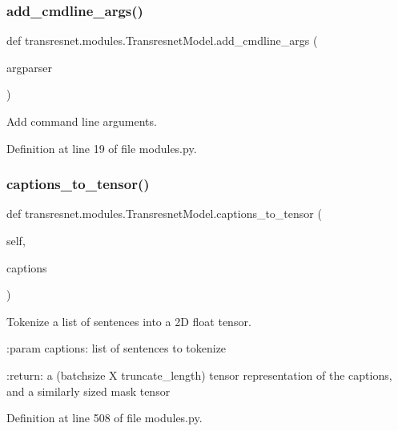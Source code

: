 \subsubsection{\texorpdfstring{add\+\_\+cmdline\+\_\+args()}{add\_cmdline\_args()}}
{\footnotesize\ttfamily def transresnet.\+modules.\+Transresnet\+Model.\+add\+\_\+cmdline\+\_\+args (\begin{DoxyParamCaption}\item[{}]{argparser }\end{DoxyParamCaption})\hspace{0.3cm}{\ttfamily [static]}}

\begin{DoxyVerb}Add command line arguments.\end{DoxyVerb}
 

Definition at line 19 of file modules.\+py.

\mbox{\label{classtransresnet_1_1modules_1_1TransresnetModel_a6d8ed65c210d4ab0a665ba305257c3d6}} 
\subsubsection{\texorpdfstring{captions\+\_\+to\+\_\+tensor()}{captions\_to\_tensor()}}
{\footnotesize\ttfamily def transresnet.\+modules.\+Transresnet\+Model.\+captions\+\_\+to\+\_\+tensor (\begin{DoxyParamCaption}\item[{}]{self,  }\item[{}]{captions }\end{DoxyParamCaption})}

\begin{DoxyVerb}Tokenize a list of sentences into a 2D float tensor.

:param captions:
    list of sentences to tokenize

:return:
    a (batchsize X truncate_length) tensor representation of the captions,
    and a similarly sized mask tensor
\end{DoxyVerb}
 

Definition at line 508 of file modules.\+py.



